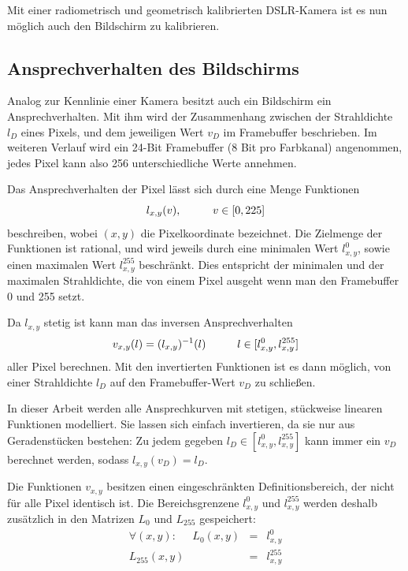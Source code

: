   Mit einer radiometrisch und geometrisch kalibrierten DSLR-Kamera ist es nun möglich auch den Bildschirm zu kalibrieren.

 \subsection{Ansprechverhalten des Bildschirms}  \label{display_response}
  
  Analog zur Kennlinie einer Kamera besitzt auch ein Bildschirm ein Ansprechverhalten. 
  Mit ihm wird der Zusammenhang zwischen der Strahldichte $l_D$ eines Pixels, und dem jeweiligen Wert $v_D$ im Framebuffer beschrieben.
  Im weiteren Verlauf wird ein 24-Bit Framebuffer (8 Bit pro Farbkanal) angenommen, jedes Pixel kann also 256 unterschiedliche Werte annehmen.
 
  Das Ansprechverhalten der Pixel lässt sich durch eine Menge Funktionen
  \begin{equation}
    l_{x,y} (v), \hspace{10mm} v \in [0,225]  
   \label{eq:display_response}
  \end{equation}
  beschreiben, wobei $(x,y)$ die Pixelkoordinate bezeichnet.
  Die Zielmenge der Funktionen ist rational, und wird jeweils durch eine minimalen Wert $l^{0}_{x,y}$, sowie einen maximalen Wert $l^{255}_{x,y}$ beschränkt.
  Dies entspricht der minimalen und der maximalen Strahldichte, die von einem Pixel ausgeht wenn man den Framebuffer 0 und 255 setzt.
 
  Da $l_{x,y}$ stetig ist kann man das inversen Ansprechverhalten
  \begin{equation}
    v_{x,y} (l) =  (l_{x,y})^{-1}(l) \hspace{10mm}  l \in [l^{0}_{x,y},l^{255}_{x,y}]
   \label{eq:inverse_display_response}
  \end{equation}
  aller Pixel berechnen. 
  Mit den invertierten Funktionen ist es dann möglich, von einer Strahldichte $l_D$ auf den Framebuffer-Wert $v_D$ zu schließen.
  
  In dieser Arbeit werden alle Ansprechkurven mit stetigen, stückweise linearen Funktionen modelliert. 
  Sie lassen sich einfach invertieren, da sie nur aus Geradenstücken bestehen: Zu jedem gegeben $l_D \in [l^{0}_{x,y},l^{255}_{x,y}]$ kann immer ein $v_D$ berechnet werden, sodass  $l_{x,y}(v_D) = l_D$.
   
  Die Funktionen $v_{x,y}$ besitzen einen eingeschränkten Definitionsbereich, der nicht für alle Pixel identisch ist. 
  Die Bereichsgrenzene $l^{0}_{x,y}$ und $l^{255}_{x,y}$  werden deshalb zusätzlich in den Matrizen $L_0$ und $L_{255}$ gespeichert:
  \begin{eqnarray}
     \forall (x,y) : \; \; \; \; \; L_0(x,y) &=& l^0_{x,y} \\
      L_{255}(x,y) & =& l^{255}_{x,y}
  \end{eqnarray}
  
